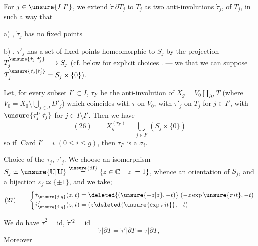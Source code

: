For  $j\in\unsure{I|I'}$, we extend $\dot\tau|\partial T_j$ to $T_j$ as two anti-involutions $\dot\tau_j$,  of $T_j$,   in such a way that


a) , $\dot\tau_j$ has no fixed points

b) , $\dot\tau'_j$ has a set of fixed points homeomorphic to $S_j$ by the projection $T_j^{\unsure{\dot\tau_j|\dot\tau'_j}}\longrightarrow S_j$ (cf. below \unsure{\}} for   explicit choices \unsure{\}}. --- we  that we can  suppose $T_j^{\unsure{\dot\tau_j|\dot\tau'_j}}=S_j\times\{0\}$).

Let, for every subset $I'\subset I$, $\tau_{I'}$ be the anti-involution of $X_g=V_0\amalg_{\partial T}T$ (where $V_0=X_0\setminus\bigcup_{j\in J}D'_j$) which coincides with $\tau$ on $V_0$, with $\tau'_j$ on $T_j$ for $j\in I'$, with $\unsure{\tau_j^0|\dot\tau_j}$ for $j\in I\setminus I'$. Then we have
\[
(26)\qquad X_g^{(\tau_{I'})}=\bigcup_{j\in I'}(S_j\times\{0\})
\]
so if $\operatorname{Card}I'=i$ $(0\leq i\leq g)$, then $\tau_{I'}$ is a $\sigma_i$.

Choice of the $\dot\tau_j$, $\dot\tau'_j$. We choose an isomorphism $S_j\simeq\unsure{\mathbb U|\mathbf U}\overset{\unsure{\mathrm{df}}}{=}\{z\in\mathbb C\mid |z|=1\}$, whence an orientation of $S_j$, and a bijection $\varepsilon_j\simeq\{\pm1\}$,  and we take;
\[
(27)\qquad
\left\{\begin{aligned}
\dot\tau_{\unsure{j|g}}(z,t)&=\deleted{(\unsure{-z|z},-t)}\;(-z\exp\unsure{\pi it},-t)\\
\dot\tau'_{\unsure{j|g}}(z,t)&=(z\deleted{\unsure{\exp\pi it}},-t)
\end{aligned}\right.
\]


 We do have $\dot\tau^2=\mathrm{id}$, $\dot\tau'{}^2=\mathrm{id}$
\[
\dot\tau|\partial T=\dot\tau'|\partial T=\tau|\partial T,
\]
Moreover


